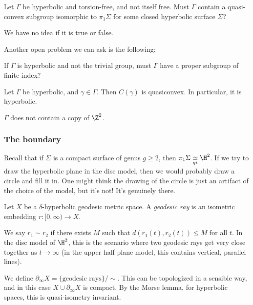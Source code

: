 \documentclass[a4paper]{article}
\newcommand{\qi}{\underset{qi}{\simeq}}
\begin{document}
\begin{question}
  Let $\Gamma$ be hyperbolic and torsion-free, and not itself free. Must $\Gamma$ contain a quasi-convex subgroup isomorphic to $\pi_1 \Sigma$ for some closed hyperbolic surface $\Sigma$?
\end{question}
We have no idea if it is true or false.

Another open problem we can ask is the following:
\begin{question}
  If $\Gamma$ is hyperbolic and not the trivial group, must $\Gamma$ have a proper subgroup of finite index?
\end{question}

\begin{prop}
  Let $\Gamma$ be hyperbolic, and $\gamma \in \Gamma$. Then $C(\gamma)$ is quasiconvex. In particular, it is hyperbolic.
\end{prop}

\begin{cor}
  $\Gamma$ does not contain a copy of $\Z^2$.
\end{cor}

\subsubsection*{The boundary}
Recall that if $\Sigma$ is a compact surface of genus $g \geq 2$, then $\pi_1 \Sigma \qi \H^2$. If we try to draw the hyperbolic plane in the disc model, then we would probably draw a circle and fill it in. One might think the drawing of the circle is just an artifact of the choice of the model, but it's not! It's genuinely there.

\begin{defi}
  Let $X$ be a $\delta$-hyperbolic geodesic metric space. A \emph{geodesic ray} is an isometric embedding $r: [0, \infty) \to X$.
\end{defi}

We say $r_1 \sim r_2$ if there exists $M$ such that $d(r_1(t), r_2(t)) \leq M$ for all $t$. In the disc model of $\H^2$, this is the scenario where two geodesic rays get very close together as $t \to \infty$ (in the upper half plane model, this contains vertical, parallel lines).

We define $\partial_\infty X = \{\text{geodesic rays}\}/\sim$. This can be topologized in a sensible way, and in this case $X \cup \partial_\infty X$ is compact. By the Morse lemma, for hyperbolic spaces, this is quasi-isometry invariant.
\end{document}

